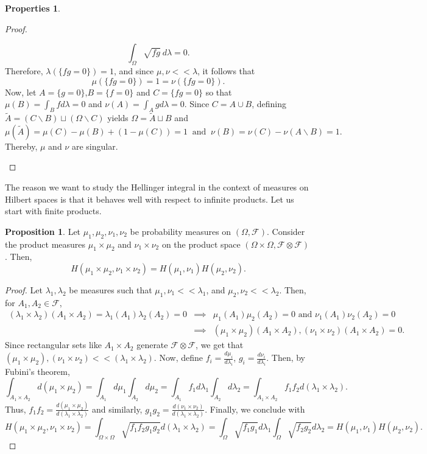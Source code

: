 \documentclass[10pt, a4paper]{report}
\theoremstyle{definition}
\newtheorem{prop}{Proposition}
\newtheorem*{properties*}{Properties}
\theoremstyle{remark}
\begin{document}
\begin{properties*}
\begin{proof}
\begin{itemize}
			$$\int_{\Omega} \sqrt{fg} \ d\lambda = 0.$$
			Therefore, $\lambda\left(\{fg=0\}\right)=1$, and since $\mu,\nu << \lambda$, it follows that 
			$$\mu\left(\{fg=0\}\right)=1=\nu\left(\{fg=0\}\right).$$
			Now, let $A=\{g=0\}$,$B = \{f=0\}$ and $C = \{fg=0\}$ so that $\mu(B)=\int_B f d\lambda=0$ and $\nu(A)=\int_A g d\lambda=0$. Since $C = A \cup B$, defining $\tilde{A} = (C\backslash B) \sqcup (\Omega\backslash C)$ yields $\Omega= \tilde{A} \sqcup B$ and 
			$$\mu(\tilde{A}) = \mu(C) - \mu(B) + (1-\mu(C)) = 1 \ \text{ and } \ \nu(B) = \nu(C) - \nu(A \backslash B) = 1.$$ 
			Thereby, $\mu$ and $\nu$ are singular.
		\end{itemize}
	\end{proof}
\end{properties*}
The reason we want to study the Hellinger integral in the context of measures on Hilbert spaces is that it behaves well with respect to infinite products. Let us start with finite products.
\begin{prop}
	Let $\mu_1,\mu_2,\nu_1,\nu_2$ be probability measures on $(\Omega,\mathcal{F})$. Consider the product measures $\mu_1\times \mu_2$ and $\nu_1\times \nu_2$ on the product space $(\Omega \times \Omega, \mathcal{F}\otimes \mathcal{F})$. Then, 
	$$H(\mu_1\times \mu_2,\nu_1\times \nu_2) = H(\mu_1,\nu_1)H(\mu_2,\nu_2).$$
	\begin{proof}
		Let $\lambda_1,\lambda_2$ be measures such that $\mu_1,\nu_1 <<\lambda_1$, and  $\mu_2,\nu_2 <<\lambda_2$. Then, for $A_1,A_2 \in \mathcal{F}$,
		\begin{eqnarray*}
			(\lambda_1 \times\lambda_2)\left(A_1 \times A_2\right) =  \lambda_1(A_1)\lambda_2(A_2) = 0 & \implies & \mu_1(A_1)\mu_2(A_2) = 0 \text{ and } \nu_1(A_1)\nu_2(A_2) = 0  \\
			& \implies & (\mu_1\times \mu_2)(A_1 \times A_2),(\nu_1\times \nu_2)(A_1 \times A_2)=0.
		\end{eqnarray*}
	Since rectangular sets like $A_1 \times A_2$ generate $\mathcal{F}\otimes \mathcal{F}$, we get that 
	$(\mu_1\times \mu_2),(\nu_1\times \nu_2) << (\lambda_1\times \lambda_2)$.
	Now, define $f_i = \frac{d\mu_i}{d\lambda_i}$, $g_i = \frac{d\nu_i}{d\lambda_i}$. Then, by Fubini's theorem,
	$$\int_{A_1\times A_2} d(\mu_1 \times \mu_2) = \int_{A_1} d\mu_1\int_{A_2}d\mu_2 =  \int_{A_1} f_1 d\lambda_1\int_{A_2}d\lambda_2 = \int_{A_1\times A_2} f_1f_2 d(\lambda_1 \times \lambda_2).$$
	Thus, $f_1f_2 = \frac{d(\mu_1 \times \mu_2)}{d(\lambda_1 \times \lambda_2)}$ and similarly, $g_1g_2 = \frac{d(\nu_1 \times \nu_2)}{d(\lambda_1 \times \lambda_2)}$. Finally, we conclude with
	$$H(\mu_1\times \mu_2,\nu_1\times \nu_2) = \int_{\Omega \times \Omega} \sqrt{f_1f_2g_1g_2}d(\lambda_1\times \lambda_2) = \int_{\Omega} \sqrt{f_1g_1}d\lambda_1\int_{\Omega} \sqrt{f_2g_2}d\lambda_2 = H(\mu_1,\nu_1)H(\mu_2,\nu_2).$$	
	\end{proof}
\end{prop}
\end{document}
